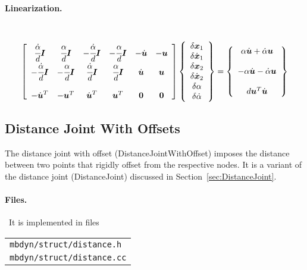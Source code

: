 \documentclass[10pt,dvips,fleqn,subeqn]{report}
\newcommand{\T}[1]{\boldsymbol{#1}}
\begin{document}
\paragraph{Linearization.} \
\begin{equation}
        \sqbr{\matr{cccccc}{
		\cfrac{\dot{\alpha}}{d}\T{I} & \cfrac{\alpha}{d}\T{I} &
			-\cfrac{\dot{\alpha}}{d}\T{I} & -\cfrac{\alpha}{d}\T{I} &
			-\dot{\T{u}} & -\T{u} \\
		-\cfrac{\dot{\alpha}}{d}\T{I} & -\cfrac{\alpha}{d}\T{I} &
			\cfrac{\dot{\alpha}}{d}\T{I} & \cfrac{\alpha}{d}\T{I} &
			\dot{\T{u}} & \T{u} \\
		\\
		-\dot{\T{u}}^T & -\T{u}^T & \dot{\T{u}}^T & \T{u}^T & \T{0} & \T{0}
	}}\cubr{\cvvect{
		\delta\T{x}_1 \\
		\delta\dot{\T{x}}_1 \\
		\delta\T{x}_2 \\
		\delta\dot{\T{x}}_2 \\
		\delta\alpha \\
		\delta\dot{\alpha}
	}} = \cubr{\cvvect{
		\alpha \dot{\T{u}} + \dot{\alpha} \T{u} \\
		\\
		-\alpha \dot{\T{u}} - \dot{\alpha} \T{u} \\
		\\
		d \T{u}^T \dot{\T{u}}
	}}
\end{equation}




\subsection{Distance Joint With Offsets}
\label{sec:DistanceJointWithOffset}
The distance joint with offset (DistanceJointWithOffset) 
imposes the distance between two points
that rigidly offset from the respective nodes.
It is a variant of the distance joint (DistanceJoint)
discussed in Section~\ref{sec:DistanceJoint}.

\paragraph{Files.} \
It is implemented in files

\begin{tabular}{l}
\texttt{mbdyn/struct/distance.h} \\
\texttt{mbdyn/struct/distance.cc}
\end{tabular}
\end{document}

